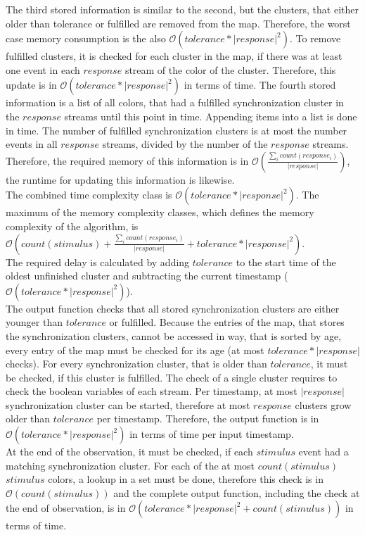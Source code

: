 	The third stored information is similar to the second, but the clusters, that either older than tolerance or fulfilled are removed from the map. Therefore, the worst case memory consumption is the also $\mathcal{O}(tolerance*|response|^2)$. To remove fulfilled clusters, it is checked for each cluster in the map, if there was at least one event in each $response$ stream of the color of the cluster. Therefore, this update is in $\mathcal{O}(tolerance*|response|^2)$ in terms of time.
	The fourth stored information is a list of all colors, that had a fulfilled synchronization cluster in the $response$ streams until this point in time. Appending items into a list is done in time. The number of fulfilled synchronization clusters is at most the number events in all $response$ streams, divided by the number of the $response$ streams. Therefore, the required memory of this information is in $\mathcal{O}\left(\frac{\sum_i count(response_i)}{|response|}\right)$, the runtime for updating this information is likewise.\\
	The combined time complexity class is $\mathcal{O}(tolerance*|response|^2)$. The maximum of the memory complexity classes, which defines the memory complexity of the algorithm, is $\mathcal{O}\left(count(stimulus)+\frac{\sum_i count(response_i)}{|response|}+tolerance*|response|^2\right)$.\\
	The required delay is calculated by adding $tolerance$ to the start time of the oldest unfinished cluster and subtracting the current timestamp ($\mathcal{O}(tolerance*|response|^2)$).\\
	The output function checks that all stored synchronization clusters are either younger than $tolerance$ or fulfilled.
	Because the entries of the map, that stores the synchronization clusters, cannot be accessed in way, that is sorted by age, every entry of the map must be checked for its age (at most $tolerance*|response|$ checks). For every synchronization cluster, that is older than $tolerance$, it must be checked, if this cluster is fulfilled. The check of a single cluster requires to check the boolean variables of each stream. Per timestamp, at most $|response|$ synchronization cluster can be started, therefore at most $response$ clusters grow older than $tolerance$ per timestamp. Therefore, the output function is in $\mathcal{O}(tolerance*|response|^2)$ in terms of time per input timestamp.\\
	At the end of the observation, it must be checked, if each $stimulus$ event had a matching synchronization cluster. For each of the at most $count(stimulus)$ $stimulus$ colors, a lookup in a set must be done, therefore this check is in $\mathcal{O}(count(stimulus))$ and the complete output function, including the check at the end of observation, is in $\mathcal{O}(tolerance*|response|^2 + count(stimulus))$ in terms of time.



